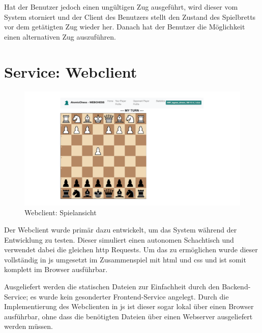 Hat der Benutzer jedoch einen ungültigen Zug ausgeführt, wird dieser vom
System storniert und der Client des Benutzers stellt den Zustand des
Spielbretts vor dem getätigten Zug wieder her. Danach hat der Benutzer
die Möglichkeit einen alternativen Zug auszuführen.

\hypertarget{service-webclient}{%
\section{Service: Webclient}\label{service-webclient}}

\begin{figure}
\centering
\includegraphics{images/ATC_webclient.png}
\caption{Webclient: Spielansicht \label{ATC_webclient}}
\end{figure}

Der Webclient wurde primär dazu entwickelt, um das System während der
Entwicklung zu testen. Dieser simuliert einen autonomen Schachtisch und
verwendet dabei die gleichen \gls{http} Requests. Um das zu ermöglichen
wurde dieser vollständig in \gls{js} umgesetzt im Zusammenspiel mit
\gls{html} und \gls{css} und ist somit komplett im Browser ausführbar.

Ausgeliefert werden die statischen Dateien zur Einfachheit durch den
Backend-Service; es wurde kein gesonderter Frontend-Service angelegt.
Durch die Implementierung des Webclienten in \gls{js} ist dieser sogar
lokal über einen Browser ausführbar, ohne dass die benötigten Dateien
über einen Webserver ausgeliefert werden müssen.

